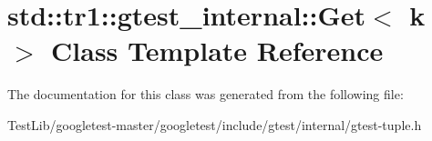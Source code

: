 \hypertarget{classstd_1_1tr1_1_1gtest__internal_1_1Get}{}\section{std\+:\+:tr1\+:\+:gtest\+\_\+internal\+:\+:Get$<$ k $>$ Class Template Reference}
\label{classstd_1_1tr1_1_1gtest__internal_1_1Get}


The documentation for this class was generated from the following file\+:\begin{DoxyCompactItemize}
\item 
Test\+Lib/googletest-\/master/googletest/include/gtest/internal/gtest-\/tuple.\+h\end{DoxyCompactItemize}
